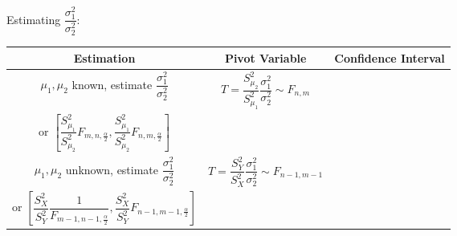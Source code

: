 \begin{enumerate}
    Estimating $\dfrac{\sigma^2_1}{\sigma_2^2}$:
    \begin{table}[htbp]
        \centering
        \renewcommand\arraystretch{2.2}
        \begin{tabular}{|c|c|c|}
            \hline
            Estimation& Pivot Variable & Confidence Interval\\
            \hline
            $\mu_1,\mu_2$ known, estimate $\dfrac{\sigma^2_1}{\sigma_2^2}$&$T=\dfrac{S_{\mu_2}^2}{S_{\mu_1}^2}\dfrac{\sigma_1^2}{\sigma^2_2}\sim F_{n,m}$&\makecell{$\left[\dfrac{S_{\mu_1}^2}{S_{\mu_2}^2}\dfrac{1}{F_{m,n,\frac{\alpha}{2}}},\dfrac{S_{\mu_1}^2}{S_{\mu_2}^2}\dfrac{1}{F_{m,n,1-\frac{\alpha}{2}}}\right]$\\or $\left[\dfrac{S_{\mu_1}^2}{S_{\mu_2}^2}{F_{m,n,\frac{\alpha}{2}}},\dfrac{S_{\mu_1}^2}{S_{\mu_2}^2}F_{n,m,\frac{\alpha}{2}}\right]$}\\
            \hline
            $\mu_1,\mu_2$ unknown, estimate $\dfrac{\sigma^2_1}{\sigma_2^2}$&$T=\dfrac{S_Y^2}{S_X^2}\dfrac{\sigma_1^2}{\sigma^2_2}\sim F_{n-1,m-1}$&\makecell{$\left[\dfrac{S_X^2}{S_Y^2}\dfrac{1}{F_{m-1,n-1,\frac{\alpha}{2}}},\dfrac{S_X^2}{S_Y^2}\dfrac{1}{F_{m-1,n-1,1-\frac{\alpha}{2}}}\right]$\\or $\left[\dfrac{S_X^2}{S_Y^2}\dfrac{1}{F_{m-1,n-1,\frac{\alpha}{2}}},\dfrac{S_X^2}{S_Y^2}F_{n-1,m-1,\frac{\alpha}{2}}\right]$}\\
            \hline
        \end{tabular}
    \end{table}
    

\end{enumerate}

